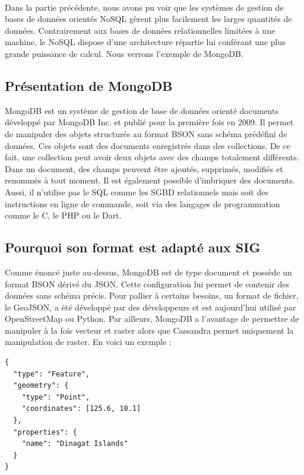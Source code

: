 \paragraph{}Dans la partie précédente, nous avons pu voir que les systèmes de gestion de bases de données orientés NoSQL gèrent plus facilement les larges quantités de données. Contrairement aux bases de données relationnelles limitées à une machine, le NoSQL dispose d’une architecture répartie lui conférant une plus grande puissance de calcul. Nous verrons l’exemple de MongoDB.

\subsection{Présentation de MongoDB}

MongoDB est un système de gestion de base de données orienté documents développé par MongoDB Inc. et publié pour la première fois en 2009. Il permet de manipuler des objets structurés au format BSON sans schéma prédéfini de données. Ces objets sont des documents enregistrés dans des collections. De ce fait, une collection peut avoir deux objets avec des champs totalement différents. Dans un document, des champs peuvent être ajoutés, supprimés, modifiés et renommés à tout moment. Il est également possible d’imbriquer des documents. Aussi, il n’utilise pas le SQL comme les SGBD relationnels mais soit des instructions en ligne de commande, soit via des langages de programmation comme le C, le PHP ou le Dart.

\subsection{Pourquoi son format est adapté aux SIG}
Comme énoncé juste au-dessus, MongoDB est de type document et possède un format BSON dérivé du JSON. Cette configuration lui permet de contenir des données sans schéma précis. Pour pallier à certains besoins, un format de fichier, le GeoJSON, a été développé par des développeurs et est aujourd’hui utilisé par OpenStreetMap ou Python. Par ailleurs, MongoDB a l’avantage de permettre de manipuler à la fois vecteur et raster alors que Cassandra \cite{mongovecteur} permet uniquement la manipulation de raster.
En voici un exemple :
\begin{verbatim}
{
  "type": "Feature",
  "geometry": {
    "type": "Point",
    "coordinates": [125.6, 10.1]
  },
  "properties": {
    "name": "Dinagat Islands"
  }
}
\end{verbatim}



